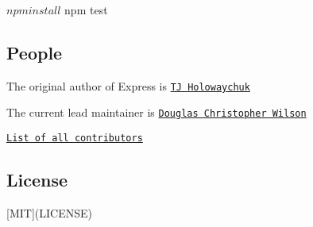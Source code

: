 \begin{DoxyCode}
$ npm install
$ npm test
\end{DoxyCode}


\subsection*{People}

The original author of Express is \href{https://github.com/tj}{\tt TJ Holowaychuk}

The current lead maintainer is \href{https://github.com/dougwilson}{\tt Douglas Christopher Wilson}

\href{https://github.com/expressjs/express/graphs/contributors}{\tt List of all contributors}

\subsection*{License}

\mbox{[}M\+IT\mbox{]}(L\+I\+C\+E\+N\+SE) 